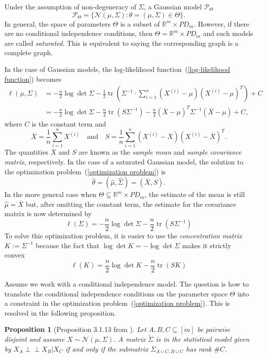 \documentclass[10pt,a4paper]{article}
\newtheorem{proposition}{Proposition}
\newcommand{\indep}{\perp \!\!\! \perp}
\begin{document}
Under the assumption of non-degeneracy of $\Sigma$, a Gaussian model $\mathcal{P}_\Theta$
\[\mathcal{P}_\Theta=\{\mathcal{N}(\mu,\Sigma):\theta=(\mu,\Sigma)\in \Theta\}.\]
In general, the space of parameters $\Theta$ is a subset of $\mathbb{R}^m \times PD_m$. However, if there are no conditional independence conditions, then $\Theta=\mathbb{R}^m \times PD_m$ and such models are called \emph{saturated}. This is equivalent to saying the corresponding graph is a complete graph.

In the case of Gaussian models, the log-likelihood function~(\ref{log-likelihood function})  becomes
\begin{align}\label{Gaussian log-likelihood}
\ell(\mu,\Sigma)&=-\frac{n}{2}\log \det \Sigma - \frac{1}{2}\operatorname{tr}\left(\Sigma^{-1}\cdot \sum_{i=1}^n(X^{(i)}-\mu)(X^{(i)}-\mu)^T\right)+C \nonumber\\
		&=-\frac{n}{2}\log \det \Sigma - \frac{n}{2}\operatorname{tr}\left(S\Sigma^{-1}\right)- \frac{n}{2}\left(\overline{X}-\mu\right)^T\Sigma^{-1}\left(\overline{X}-\mu\right)+C,
\end{align}
where $C$ is the constant term and
\[\overline{X}=\frac{1}{n}\sum_{i=1}^nX^{(i)} \quad \text{and} \quad S=\frac{1}{n}\sum_{i=1}^n(X^{(i)}-\overline{X})(X^{(i)}-\overline{X})^T.\]
The quantities $\overline{X}$ and $S$ are known as the \emph{sample mean} and \emph{sample covariance matrix}, respectively.
In the case of a saturated Gaussian model, the solution to the optimization problem~(\ref{optimization problem}) is
\[\hat{\theta}=(\hat{\mu},\hat{\Sigma})=(\overline{X},S).\]
In the more general case when $\Theta\subsetneq\mathbb{R}^m \times PD_m$, the estimate of the mean is still $\hat{\mu}=\overline{X}$ but, after omitting the constant term, the estimate for the covariance matrix is now determined by
\begin{equation*}
\ell(\Sigma)=-\frac{n}{2}\log \det \Sigma - \frac{n}{2}\operatorname{tr}\left(S\Sigma^{-1}\right)
\end{equation*}
To solve this optimization problem, it is easier to use the \emph{concentration matrix} $K:=\Sigma^{-1}$ because the fact that $\log \det K=-\log \det \Sigma$ makes it strictly convex
\begin{equation}
\ell(K)=\frac{n}{2}\log \det K - \frac{n}{2}\operatorname{tr}\left(SK\right)
\end{equation}

Assume we work with a conditional independence model. The question is how to translate the conditional independence conditions on the parameter space $\Theta$ into a constraint in the optimization problem~(\ref{optimization problem}). This is resolved in the following proposition.
\begin{proposition}[Proposition 3.1.13 from \cite{drton2008lectures}]\label{prop: CI submatrix condition}
Let $A,B,C\subseteq[m]$ be pairwise disjoint and assume  $X\sim \mathcal{N}(\mu, \Sigma)$. A matrix $\tilde{\Sigma}$ is in the statistical model given by $X_A\indep X_B|X_C$ if and only if the submatrix $\Sigma_{A\cup C,B \cup C}$ has rank $\#C$.
\end{proposition}
\end{document}
